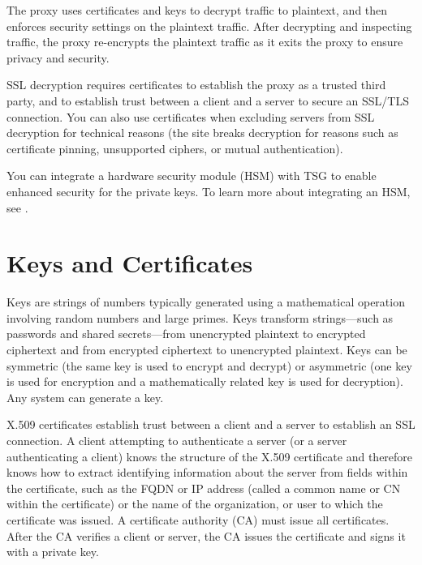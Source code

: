 The proxy uses certificates and keys to decrypt traffic to plaintext, and then enforces security settings on the plaintext traffic. After decrypting and inspecting traffic, the proxy re-encrypts the plaintext traffic as it exits the proxy to ensure privacy and security.


SSL decryption requires certificates to establish the proxy as a trusted third party, and to establish trust between a client and a server to secure an SSL/TLS connection. You can also use certificates when excluding servers from SSL decryption for technical reasons (the site breaks decryption for reasons such as certificate pinning, unsupported ciphers, or mutual authentication).


You can integrate a hardware security module (HSM) with TSG to enable enhanced security for the private keys. 
To learn more about integrating an HSM, see \hyperlink{link:Manage Keys with a Hardware Security Module}{\color{linkblue}{Manage Keys with a Hardware Security Module}}.

\section*{\hypertarget{link:Keys and Certificates}{Keys and Certificates}}
\label{sec:decrypt:keys}

Keys are strings of numbers typically generated using a mathematical operation involving random numbers and large primes. Keys transform strings—such as passwords and shared secrets—from unencrypted plaintext to encrypted ciphertext and from encrypted ciphertext to unencrypted plaintext. Keys can be symmetric (the same key is used to encrypt and decrypt) or asymmetric (one key is used for encryption and a mathematically related key is used for decryption). Any system can generate a key.


X.509 certificates establish trust between a client and a server to establish an SSL connection. A client attempting to authenticate a server (or a server authenticating a client) knows the structure of the X.509 certificate and therefore knows how to extract identifying information about the server from fields within the certificate, such as the FQDN or IP address (called a common name or CN within the certificate) or the name of the organization, or user to which the certificate was issued. A certificate authority (CA) must issue all certificates. After the CA verifies a client or server, the CA issues the certificate and signs it with a private key.


